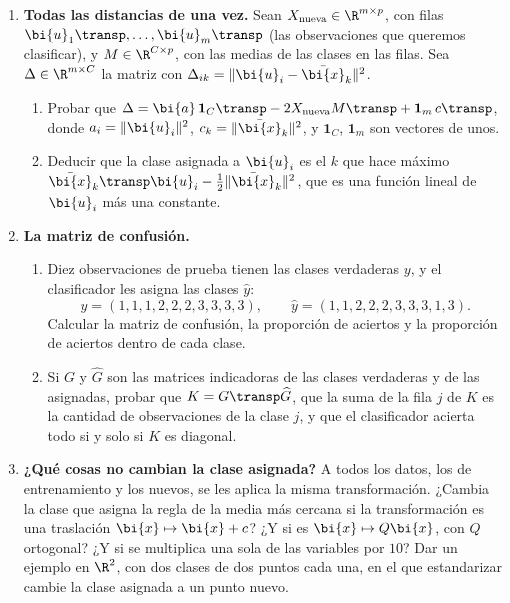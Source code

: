 \begin{enumerate}[leftmargin=*,label=\textbf{\thechapter.\arabic*},ref=\thechapter.\arabic*,itemsep=4pt]
\item {} \textbf{Todas las distancias de una vez.}\label{clas-ej:distancias}
Sean $X_{\text{nueva}}\in\R^{m\times p}$, con filas $\bi{u}_1\transp,\dots,\bi{u}_m\transp$
(las observaciones que queremos clasificar), y $M\in\R^{C\times p}$, con las
medias de las clases en las filas. Sea $\Delta\in\R^{m\times C}$ la matriz con
$\Delta_{ik}=\|\bi{u}_i-\bar{\bi{x}}_k\|^2$.
\begin{enumerate}[label=(\alph*)]
\item Probar que $\Delta=\bi{a}\,\mathbf 1_C\transp-2X_{\text{nueva}}M\transp+\mathbf 1_m\,c\transp$,
donde $a_i=\|\bi{u}_i\|^2$, $c_k=\|\bar{\bi{x}}_k\|^2$, y $\mathbf 1_C$, $\mathbf 1_m$ son
vectores de unos.
\item Deducir que la clase asignada a $\bi{u}_i$ es el $k$ que hace máximo
$\bar{\bi{x}}_k\transp \bi{u}_i-\frac12\|\bar{\bi{x}}_k\|^2$, que es una función lineal de $\bi{u}_i$
más una constante.
\end{enumerate}

\item {} \textbf{La matriz de confusión.}\label{clas-ej:confusion}
\begin{enumerate}[label=(\alph*)]
\item Diez observaciones de prueba tienen las clases verdaderas $y$, y el
clasificador les asigna las clases $\hat y$:
\[
y=(1,1,1,2,2,2,3,3,3,3),\qquad \hat y=(1,1,2,2,2,3,3,3,1,3).
\]
Calcular la matriz de confusión, la proporción de aciertos y la proporción de
aciertos dentro de cada clase.
\item Si $G$ y $\widehat G$ son las matrices indicadoras de las clases
verdaderas y de las asignadas, probar que $K=G\transp\widehat G$, que la suma
de la fila $j$ de $K$ es la cantidad de observaciones de la clase $j$, y que
el clasificador acierta todo si y solo si $K$ es diagonal.
\end{enumerate}

\item {} \textbf{¿Qué cosas no cambian la clase asignada?}\label{clas-ej:invariancias}
A todos los datos, los de entrenamiento y los nuevos, se les aplica la misma
transformación. ¿Cambia la clase que asigna la regla de la media más cercana
si la transformación es una traslación $\bi{x}\mapsto \bi{x}+c$? ¿Y si es $\bi{x}\mapsto Q\bi{x}$,
con $Q$ ortogonal? ¿Y si se multiplica una sola de las variables por $10$? Dar
un ejemplo en $\R^2$, con dos clases de dos puntos cada una, en el que
estandarizar cambie la clase asignada a un punto nuevo.


\end{enumerate}
